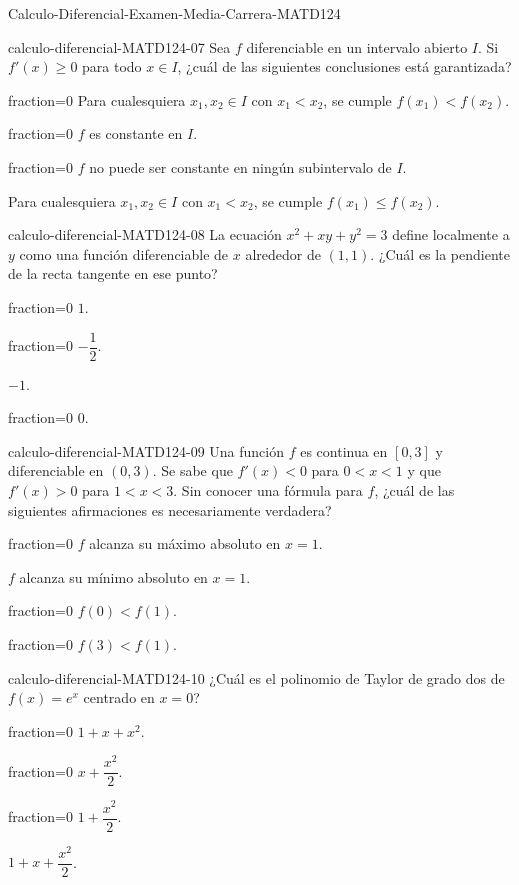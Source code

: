 \documentclass[10pt]{article}
\begin{document}
\begin{quiz}{Calculo-Diferencial-Examen-Media-Carrera-MATD124}
\begin{multi}[single=true,shuffle=false]{calculo-diferencial-MATD124-07}
Sea $f$ diferenciable en un intervalo abierto $I$. Si $f'(x)\geq0$
para todo $x\in I$, ¿cuál de las siguientes conclusiones está garantizada?
    \item[fraction=0] Para cualesquiera $x_1,x_2\in I$ con $x_1<x_2$,
    se cumple $f(x_1)<f(x_2)$.
    \item[fraction=0] $f$ es constante en $I$.
    \item[fraction=0] $f$ no puede ser constante en ningún subintervalo de $I$.
    \item* Para cualesquiera $x_1,x_2\in I$ con $x_1<x_2$,
    se cumple $f(x_1)\leq f(x_2)$.
\end{multi}


\begin{multi}[single=true,shuffle=false]{calculo-diferencial-MATD124-08}
La ecuación $x^2+xy+y^2=3$ define localmente a $y$ como una
función diferenciable de $x$ alrededor de $(1,1)$. ¿Cuál es la pendiente de
la recta tangente en ese punto?
    \item[fraction=0] $1$.
    \item[fraction=0] $-\dfrac{1}{2}$.
    \item* $-1$.
    \item[fraction=0] $0$.
\end{multi}


\begin{multi}[single=true,shuffle=false]{calculo-diferencial-MATD124-09}
Una función $f$ es continua en $[0,3]$ y diferenciable en $(0,3)$.
Se sabe que $f'(x)<0$ para $0<x<1$ y que $f'(x)>0$ para $1<x<3$.
Sin conocer una fórmula para $f$, ¿cuál de las siguientes afirmaciones
es necesariamente verdadera?
    \item[fraction=0] $f$ alcanza su máximo absoluto en $x=1$.
    \item* $f$ alcanza su mínimo absoluto en $x=1$.
    \item[fraction=0] $f(0)<f(1)$.
    \item[fraction=0] $f(3)<f(1)$.
\end{multi}


\begin{multi}[single=true,shuffle=false]{calculo-diferencial-MATD124-10}
¿Cuál es el polinomio de Taylor de grado dos de $f(x)=e^x$
centrado en $x=0$?
    \item[fraction=0] $1+x+x^2$.
    \item[fraction=0] $x+\dfrac{x^2}{2}$.
    \item[fraction=0] $1+\dfrac{x^2}{2}$.
    \item* $1+x+\dfrac{x^2}{2}$.
\end{multi}

\end{quiz}
\end{document}
